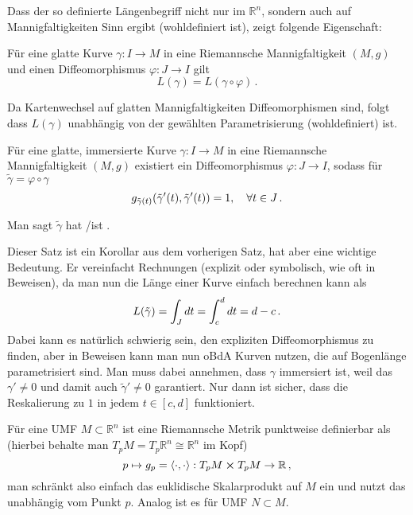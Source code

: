\documentclass[../H_Analysis_main.tex]{subfiles}
\begin{document}
Dass der so definierte Längenbegriff nicht nur im $\mathbb{R}^n$, sondern auch auf Mannigfaltigkeiten Sinn ergibt (wohldefiniert ist), zeigt folgende Eigenschaft:
\begin{satz}
Für eine glatte Kurve $\gamma: I \rightarrow M$ in eine Riemannsche Mannigfaltigkeit $(M, g)$ und einen Diffeomorphismus $\varphi: J \rightarrow I$ gilt
\begin{equation}
L(\gamma) = L(\gamma \circ \varphi) \, .
\end{equation}
\end{satz}
Da Kartenwechsel auf glatten Mannigfaltigkeiten Diffeomorphismen sind, folgt dass $L(\gamma)$ unabhängig von der gewählten Parametrisierung (wohldefiniert) ist.

\begin{satz}[Bogenlänge]
Für eine glatte, immersierte Kurve $\gamma: I \rightarrow M$ in eine Riemannsche Mannigfaltigkeit $(M, g)$ existiert ein Diffeomorphismus $\varphi: J \rightarrow I$, sodass für $\tilde{\gamma} = \varphi \circ \gamma$
\begin{equation}
g_{\tilde{\gamma}(t)}\qty(\tilde{\gamma}'(t), \tilde{\gamma}'(t)) = 1, \quad \forall t \in J \, .
\end{equation}

Man sagt $\tilde{\gamma}$ hat /ist .
\end{satz}

Dieser Satz ist ein Korollar aus dem vorherigen Satz, hat aber eine wichtige Bedeutung. Er vereinfacht Rechnungen (explizit oder symbolisch, wie oft in Beweisen), da man nun die Länge einer Kurve einfach berechnen kann als
\begin{equation*}
L\qty(\tilde{\gamma}) = \int_J dt = \int_c^d dt = d - c \, .
\end{equation*}
Dabei kann es natürlich schwierig sein, den expliziten Diffeomorphismus zu finden, aber in Beweisen kann man nun oBdA Kurven nutzen, die auf Bogenlänge parametrisiert sind. Man muss dabei annehmen, dass $\gamma$ immersiert ist, weil das $\gamma' \neq 0$ und damit auch $\tilde{\gamma}' \neq 0$ garantiert. Nur dann ist sicher, dass die Reskalierung zu $1$ in jedem $t \in [c, d]$ funktioniert.


\begin{bsp}[Untermannigfaltigkeit]
Für eine UMF $M \subset \mathbb{R}^n$ ist eine Riemannsche Metrik punktweise definierbar als (hierbei behalte man $T_p M = T_p \mathbb{R}^n \cong \mathbb{R}^n$ im Kopf)
\begin{equation}
p \mapsto g_p = \langle \cdot, \cdot \rangle: T_p M \cross T_p M \rightarrow \mathbb{R} \, ,
\end{equation}
man schränkt also einfach das euklidische Skalarprodukt auf $M$ ein und nutzt das unabhängig vom Punkt $p$. Analog ist es für UMF $N \subset M$. 
\end{bsp}
\end{document}
